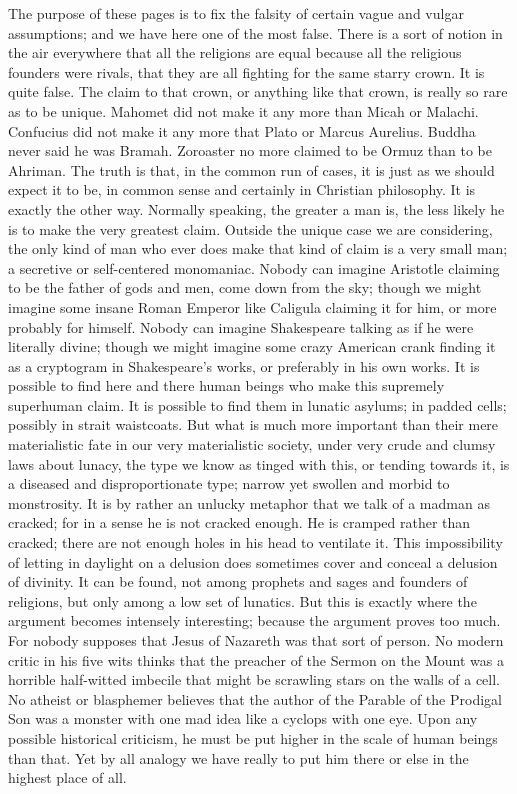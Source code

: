 The purpose of these pages is to fix the falsity of certain vague and vulgar assumptions; and we have here one of the most false. There is a sort of notion in the air everywhere that all the religions are equal because all the religious founders were rivals, that they are all fighting for the same starry crown. It is quite false. The claim to that crown, or anything like that crown, is really so rare as to be unique. Mahomet did not make it any more than Micah or Malachi. Confucius did not make it any more that Plato or Marcus Aurelius. Buddha never said he was Bramah. Zoroaster no more claimed to be Ormuz than to be Ahriman. The truth is that, in the common run of cases, it is just as we should expect it to be, in common sense and certainly in Christian philosophy. It is exactly the other way. Normally speaking, the greater a man is, the less likely he is to make the very greatest claim. Outside the unique case we are considering, the only kind of man who ever does make that kind of claim is a very small man; a secretive or self-centered monomaniac. Nobody can imagine Aristotle claiming to be the father of gods and men, come down from the sky; though we might imagine some insane Roman Emperor like Caligula claiming it for him, or more probably for himself. Nobody can imagine Shakespeare talking as if he were literally divine; though we might imagine some crazy American crank finding it as a cryptogram in Shakespeare's works, or preferably in his own works. It is possible to find here and there human beings who make this supremely superhuman claim. It is possible to find them in lunatic asylums; in padded cells; possibly in strait waistcoats. But what is much more important than their mere materialistic fate in our very materialistic society, under very crude and clumsy laws about lunacy, the type we know as tinged with this, or tending towards it, is a diseased and disproportionate type; narrow yet swollen and morbid to monstrosity. It is by rather an unlucky metaphor that we talk of a madman as cracked; for in a sense he is not cracked enough. He is cramped rather than cracked; there are not enough holes in his head to ventilate it. This impossibility of letting in daylight on a delusion does sometimes cover and conceal a delusion of divinity. It can be found, not among prophets and sages and founders of religions, but only among a low set of lunatics. But this is exactly where the argument becomes intensely interesting; because the argument proves too much. For nobody supposes that Jesus of Nazareth was that sort of person. No modern critic in his five wits thinks that the preacher of the Sermon on the Mount was a horrible half-witted imbecile that might be scrawling stars on the walls of a cell. No atheist or blasphemer believes that the author of the Parable of the Prodigal Son was a monster with one mad idea like a cyclops with one eye. Upon any possible historical criticism, he must be put higher in the scale of human beings than that. Yet by all analogy we have really to put him there or else in the highest place of all.

